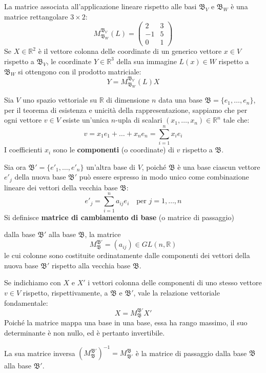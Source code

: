 \begin{richiamo}
        La matrice associata all'applicazione lineare rispetto alle basi $\mathfrak{B}_V$ e $\mathfrak{B}_W$ è una matrice rettangolare $3 \times 2$:
        \[
        M_{\mathfrak{B}_W}^{\mathfrak{B}_V}(L) = \begin{pmatrix} 2 & 3 \\ -1 & 5 \\ 0 & 1 \end{pmatrix}
        \]
        Se $X \in \mathbb{R}^2$ è il vettore colonna delle coordinate di un generico vettore $x \in V$ rispetto a $\mathfrak{B}_V$, le coordinate $Y \in \mathbb{R}^3$ della sua immagine $L(x) \in W$ rispetto a $\mathfrak{B}_W$ si ottengono con il prodotto matriciale:
        \[
        Y = M_{\mathfrak{B}_W}^{\mathfrak{B}_V}(L) X
        \]
        \end{richiamo}
        \begin{richiamo}
        \mbox{}

        Sia $V$ uno spazio vettoriale su $\mathbb{R}$ di dimensione $n$ data una base $\mathfrak{B} = \{e_1, \dots, e_n\}$, per il teorema di esistenza e unicità della rappresentazione, sappiamo che per ogni vettore $v \in V$ esiste un'unica $n$-upla di scalari $(x_1, \dots, x_n) \in \mathbb{R}^n$ tale che:
        \[
        v = x_1 e_1 + \dots + x_n e_n = \sum_{i=1}^n x_i e_i
        \]
        I coefficienti $x_i$ sono le \textbf{componenti} (o coordinate) di $v$ rispetto a $\mathfrak{B}$.

        Sia ora $\mathfrak{B}' = \{e'_1, \dots, e'_n\}$ un'altra base di $V$, poiché $\mathfrak{B}$ è una base ciascun vettore $e'_j$ della nuova base $\mathfrak{B}'$ può essere espresso in modo unico come combinazione lineare dei vettori della vecchia base $\mathfrak{B}$:
        \[
        e'_j = \sum_{i=1}^n a_{ij} e_i \quad \text{per } j = 1, \dots, n
        \]
        Si definisce \textbf{matrice di cambiamento di base} (o matrice di passaggio) 
        
        dalla base $\mathfrak{B}'$ alla base $\mathfrak{B}$, la matrice 
        \[ M_{\mathfrak{B}}^{\mathfrak{B}'} = (a_{ij}) \in GL(n, \mathbb{R}) \] le cui colonne sono costituite ordinatamente dalle componenti dei vettori della nuova base $\mathfrak{B}'$ rispetto alla vecchia base $\mathfrak{B}$.

        Se indichiamo con $X$ e $X'$ i vettori colonna delle componenti di uno stesso vettore $v \in V$ rispetto, rispettivamente, a $\mathfrak{B}$ e $\mathfrak{B}'$, vale la relazione vettoriale fondamentale:
        \[
        X = M_{\mathfrak{B}}^{\mathfrak{B}'} X'
        \]
        Poiché la matrice mappa una base in una base, essa ha rango massimo, il suo determinante è non nullo, ed è pertanto invertibile. 
        
        La sua matrice inversa $(M_{\mathfrak{B}}^{\mathfrak{B}'})^{-1} = M_{\mathfrak{B}'}^{\mathfrak{B}}$ è la matrice di passaggio dalla base $\mathfrak{B}$ alla base $\mathfrak{B}'$.
        \end{richiamo}
